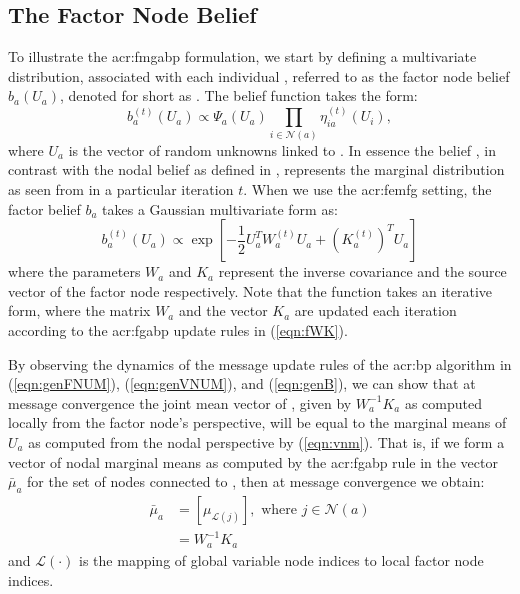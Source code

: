 \subsection{The Factor Node Belief}

To illustrate the \gls{acr:fmgabp} formulation, we start by defining a multivariate distribution, associated with each individual , referred to as the factor node belief $b_a(U_a)$, denoted for short as .
The belief  function takes the form:
\begin{equation}
	b_{a}^{(t)}(U_{a}) \propto \Psi_{a}(U_{a}) \prod_{i\in\mathcal{N}(a)}\eta_{ia}^{(t)}(U_{i}), \label{eqn:genFB}
\end{equation}
where $U_a$ is the vector of random unknowns linked to .
In essence the belief , in contrast with the nodal belief  as defined in , represents the marginal distribution as seen from  in a particular iteration $t$.
When we use the \gls{acr:femfg} setting, the factor belief $b_a$ takes a Gaussian multivariate form as:
\begin{equation}
	b_{a}^{(t)}(U_a) \propto\exp\left[-\frac{1}{2}U_{a}^{T}W_{a}^{(t)}U_{a}+(K_{a}^{(t)})^{T}U_{a}\right] \label{eqn:gaussFB}
\end{equation}
where the parameters $W_a$ and $K_a$ represent the inverse covariance and the source vector of the factor node respectively.
Note that the function  takes an iterative form, where the matrix $W_a$ and the vector $K_a$ are updated each iteration according to the \gls{acr:fgabp} update rules in (\ref{eqn:fWK}).


By observing the dynamics of the message update rules of the \gls{acr:bp} algorithm in (\ref{eqn:genFNUM}), (\ref{eqn:genVNUM}), and (\ref{eqn:genB}), we can show that at message convergence the joint mean vector of , given by $W_{a}^{-1}K_a$ as computed locally from the factor node's perspective, will be equal to the marginal means of $U_a$ as computed from the nodal perspective by (\ref{eqn:vnm}).
That is, if we form a vector of nodal marginal means as computed by the \gls{acr:fgabp} rule  in the vector $\bar{\mu}_a$ for the set of nodes connected to , then at message convergence we obtain:
\begin{align}
	\bar{\mu}_a & = \left[\mu_{\mathcal{L}(j)}\right],\,\,\text{where } j\in\mathcal{N}(a)\\
	& = W_{a}^{-1}K_a \label{eqn:fpMarj}
\end{align}
and $\mathcal{L(\cdot)}$ is the mapping of global variable node indices to local factor node indices.


